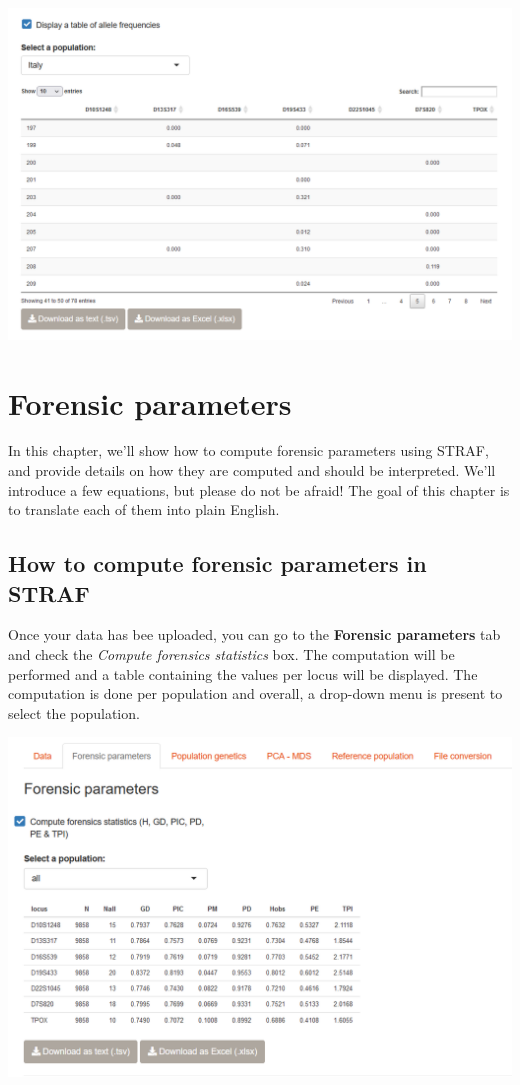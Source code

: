 \documentclass[
]{book}
\begin{document}
\includegraphics[width=0.8\linewidth]{img/capture_import_3}

\hypertarget{forensic-parameters}{%
\chapter{Forensic parameters}\label{forensic-parameters}}

In this chapter, we'll show how to compute forensic parameters using STRAF, and
provide details on how they are computed and should be interpreted.
We'll introduce a few equations, but please do not be afraid! The goal of
this chapter is to translate each of them into plain English.

\hypertarget{how-to-compute-forensic-parameters-in-straf}{%
\section{How to compute forensic parameters in STRAF}\label{how-to-compute-forensic-parameters-in-straf}}

Once your data has bee uploaded, you can go to the \textbf{Forensic parameters} tab
and check the \emph{Compute forensics statistics} box. The computation will be performed
and a table containing the values per locus will be displayed. The computation is done
per population and overall, a drop-down menu is present to select the population.

\includegraphics[width=0.8\linewidth]{img/capture_forensics_parameters_1}
\end{document}
